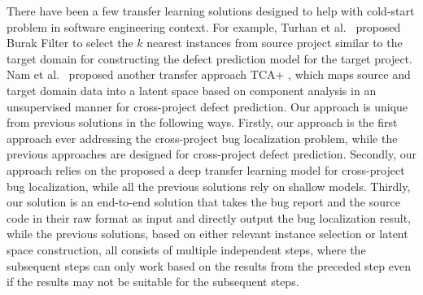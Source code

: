 
There have been a few transfer learning solutions designed to help with cold-start problem in software engineering context. For example, Turhan et al.~\cite{TurhanMBS09} proposed Burak Filter to select the $k$ nearest instances from source project similar to the target domain for constructing the defect prediction model for the target project. Nam et al.~\cite{Nam2013transfer} proposed another transfer approach TCA+ , which maps source and target domain data into a latent space based on component analysis in an unsupervised manner for cross-project defect prediction. Our approach is unique from previous solutions in the following ways. Firstly, our approach is the first approach ever addressing the cross-project bug localization problem, while the previous approaches are designed for cross-project defect prediction. Secondly, our approach relies on the proposed a deep transfer learning model \TRANPCNN for cross-project bug localization, while all the previous solutions rely on shallow models. Thirdly, our solution is an end-to-end solution that takes the bug report and the source code in their raw format as input and directly output the bug localization result, while the previous solutions,  based on either relevant instance selection or latent space construction, all consists of multiple independent steps, where the subsequent steps can only work based on the results from the preceded step even if the results may not be suitable for the subsequent steps. 




